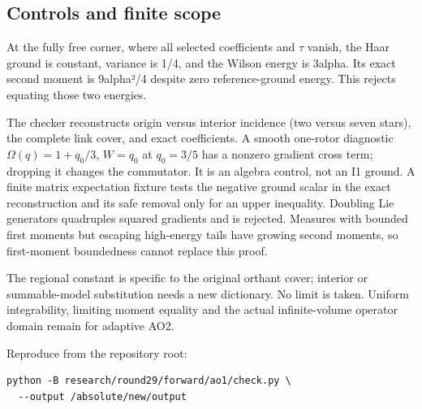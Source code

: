 \hypertarget{r29-ao1-controls-and-finite-scope}{%
\subsection{Controls and finite scope}\label{r29:ao1:r29-ao1-controls-and-finite-scope}}

At the fully free corner, where all selected coefficients and \(\tau\) vanish, the Haar ground is constant, variance is 1/4, and the Wilson energy is 3alpha. Its exact second moment is 9alpha²/4 despite zero reference-ground energy. This rejects equating those two energies.

The checker reconstructs origin versus interior incidence (two versus seven stars), the complete link cover, and exact coefficients. A smooth one-rotor diagnostic \(\Omega(q)=1+q_0/3\), \(W=q_0\) at \(q_0=3/5\) has a nonzero gradient cross term; dropping it changes the commutator. It is an algebra control, not an I1 ground. A finite matrix expectation fixture tests the negative ground scalar in the exact reconstruction and its safe removal only for an upper inequality. Doubling Lie generators quadruples squared gradients and is rejected. Measures with bounded first moments but escaping high-energy tails have growing second moments, so first-moment boundedness cannot replace this proof.

The regional constant is specific to the original orthant cover; interior or summable-model substitution needs a new dictionary. No limit is taken. Uniform integrability, limiting moment equality and the actual infinite-volume operator domain remain for adaptive AO2.

Reproduce from the repository root:
\begin{verbatim}
python -B research/round29/forward/ao1/check.py \
  --output /absolute/new/output
\end{verbatim}

